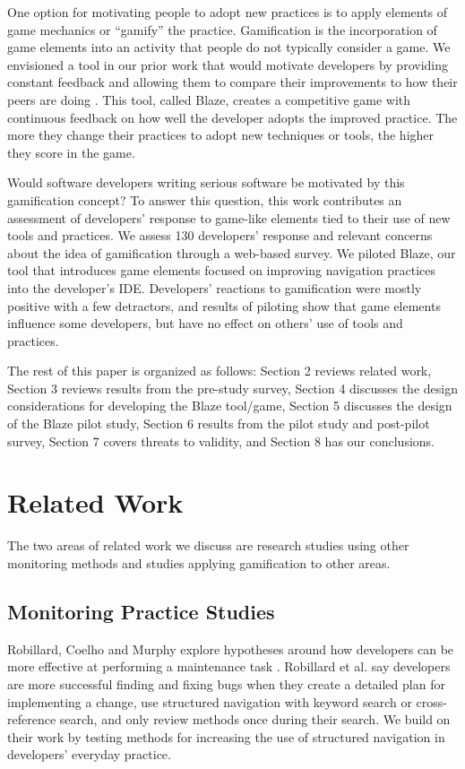 \documentclass{sig-alternate}
\begin{document}
One option for motivating people to adopt new practices is to apply elements of game mechanics or ``gamify'' the practice. Gamification is the incorporation of game elements into an activity that people do not typically consider a game\cite{2013Oxford}.  We envisioned a tool in our prior work that would motivate developers by providing constant feedback and allowing them to compare their improvements to how their peers are doing \cite{Snipes2013Towards}.  This tool, called Blaze, creates a competitive game with continuous feedback on how well the developer adopts the improved practice.  The more they change their practices to adopt new techniques or tools, the higher they score in the game. 

Would software developers writing serious software be motivated by this gamification concept? To answer this question, this work contributes an assessment of developers' response to game-like elements tied to their use of new tools and practices.  We assess 130 developers' response and relevant concerns about the idea of gamification through a web-based survey.  We piloted Blaze, our tool that introduces game elements focused on improving navigation practices into the developer's IDE.  Developers' reactions to gamification were mostly positive with a few detractors, and results of piloting show that game elements influence some developers, but have no effect on others' use of tools and practices.

The rest of this paper is organized as follows:  Section 2 reviews related work, Section 3 reviews results from the pre-study survey, Section 4 discusses the design considerations for developing the Blaze tool/game, Section 5 discusses the design of the Blaze pilot study, Section 6 results from the pilot study and post-pilot survey, Section 7 covers threats to validity, and Section 8 has our conclusions.

\section{Related Work}
\label{sec:RelatedWork}
The two areas of related work we discuss are research studies using other monitoring methods and studies applying gamification to other areas.

\subsection{Monitoring Practice Studies}

Robillard, Coelho and Murphy explore hypotheses around how developers can be more effective at performing a maintenance task \cite{wbsnipes:Robillard2004How}.  Robillard et al. say developers are more successful finding and fixing bugs when they create a detailed plan for implementing a change, use structured navigation with keyword search or cross-reference search, and only review methods once during their search.  We build on their work by testing methods for increasing the use of structured navigation in developers' everyday practice.
\end{document}
